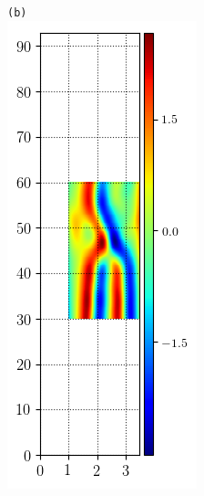 \documentclass[mathserif, handout]{beamer}
\begin{document}
\begin{frame}
\begin{figure}
\begin{minipage}[height=.48\textheight]{.48\textwidth}
\end{minipage}
\begin{minipage}[height=.48\textheight]{.48\textwidth}
\centering \small{\texttt{(b)}}\\
\includegraphics[width=.8\textwidth,height=.4\textheight]{MNG_ppo_subdomain_HOD}
\end{minipage}
\end{figure}
\end{frame}
\end{document}
